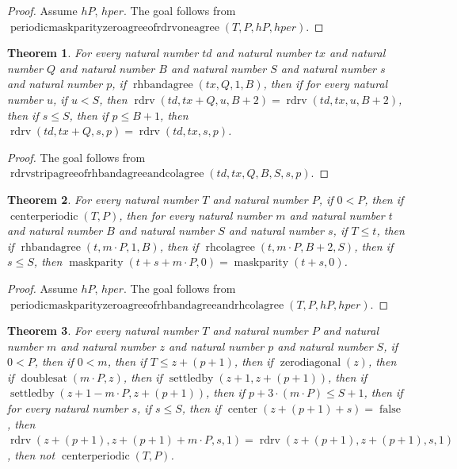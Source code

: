 \documentclass[11pt]{article}
\newtheorem{theorem}{Theorem}[section]
\theoremstyle{definition}
\begin{document}
\begin{proof}
Assume \(hP\), \(hper\).
The goal follows from \(\operatorname{periodicmaskparityzeroagreeofrdrvoneagree}(T, P, hP, hper)\).
\end{proof}
\begin{theorem}
\label{ll:paper:rdrv-strip-agree-of-rhbandagree-and-col-agree}
For every natural number \(td\) and natural number \(tx\) and natural number \(Q\) and natural number \(B\) and natural number \(S\) and natural number \(s\) and natural number \(p\), if \(\operatorname{rhbandagree}(tx, Q, 1, B)\), then if for every natural number \(u\), if \(u < S\), then \(\operatorname{rdrv}(td, tx + Q, u, B + 2) = \operatorname{rdrv}(td, tx, u, B + 2)\), then if \(s \le S\), then if \(p \le B + 1\), then \(\operatorname{rdrv}(td, tx + Q, s, p) = \operatorname{rdrv}(td, tx, s, p)\).
\end{theorem}
\begin{proof}
The goal follows from \(\operatorname{rdrvstripagreeofrhbandagreeandcolagree}(td, tx, Q, B, S, s, p)\).
\end{proof}
\begin{theorem}
\label{ll:paper:periodic-maskparity-zero-agree-of-rhbandagree-and-rhcolagree}
For every natural number \(T\) and natural number \(P\), if \(0 < P\), then if \(\operatorname{centerperiodic}(T, P)\), then for every natural number \(m\) and natural number \(t\) and natural number \(B\) and natural number \(S\) and natural number \(s\), if \(T \le t\), then if \(\operatorname{rhbandagree}(t, m \cdot P, 1, B)\), then if \(\operatorname{rhcolagree}(t, m \cdot P, B + 2, S)\), then if \(s \le S\), then \(\operatorname{maskparity}(t + s + m \cdot P, 0) = \operatorname{maskparity}(t + s, 0)\).
\end{theorem}
\begin{proof}
Assume \(hP\), \(hper\).
The goal follows from \(\operatorname{periodicmaskparityzeroagreeofrhbandagreeandrhcolagree}(T, P, hP, hper)\).
\end{proof}
\begin{theorem}
\label{ll:paper:not-centerperiodic-of-rdrv-one-agree-at-zero-diag-step-two}
For every natural number \(T\) and natural number \(P\) and natural number \(m\) and natural number \(z\) and natural number \(p\) and natural number \(S\), if \(0 < P\), then if \(0 < m\), then if \(T \le z + (p + 1)\), then if \(\operatorname{zerodiagonal}(z)\), then if \(\operatorname{doublesat}(m \cdot P, z)\), then if \(\operatorname{settledby}(z + 1, z + (p + 1))\), then if \(\operatorname{settledby}(z + 1 - m \cdot P, z + (p + 1))\), then if \(p + 3 \cdot (m \cdot P) \le S + 1\), then if for every natural number \(s\), if \(s \le S\), then if \(\operatorname{center}(z + (p + 1) + s) = \operatorname{false}\), then \(\operatorname{rdrv}(z + (p + 1), z + (p + 1) + m \cdot P, s, 1) = \operatorname{rdrv}(z + (p + 1), z + (p + 1), s, 1)\), then not \(\operatorname{centerperiodic}(T, P)\).
\end{theorem}
\end{document}
